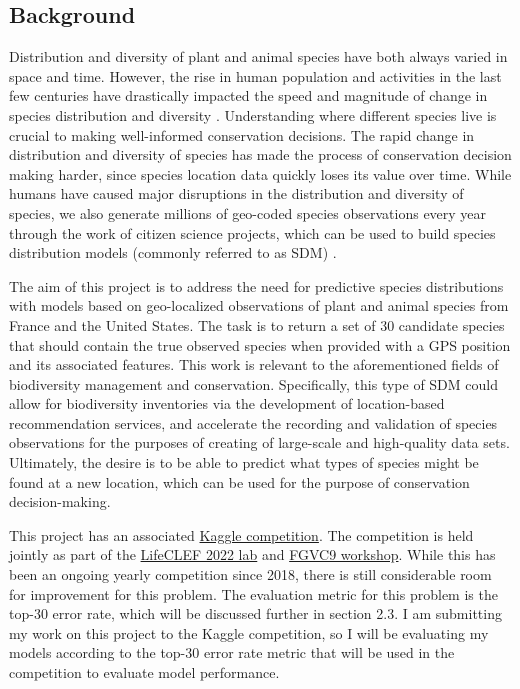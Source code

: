\documentclass[12pt, oneside]{article}
\begin{document}
\begin{normalsize}

\subsection{Background}

Distribution and diversity of plant and animal species have both always varied in space and time. However, the rise in human population and activities in the last few centuries have drastically impacted the speed and magnitude of change in species distribution and diversity \cite{pinto2021predicting}. Understanding where different species live is crucial to making well-informed conservation decisions. The rapid change in distribution and diversity of species has made the process of conservation decision making harder, since species location data quickly loses its value over time. While humans have caused major disruptions in the distribution and diversity of species, we also generate millions of geo-coded species observations every year through the work of citizen science projects, which can be used to build species distribution models (commonly referred to as SDM) \cite{lorieul2021overview}.

	The aim of this project is to address the need for predictive species distributions with models based on geo-localized observations of plant and animal species from France and the United States. The task is to return a set of 30 candidate species that should contain the true observed species when provided with a GPS position and its associated features. This work is relevant to the aforementioned fields of biodiversity management and conservation. Specifically, this type of SDM could allow for biodiversity inventories via the development of location-based recommendation services, and accelerate the recording and validation of species observations for the purposes of creating of large-scale and high-quality data sets. Ultimately, the desire is to be able to predict what types of species might be found at a new location, which can be used for the purpose of conservation decision-making.

This project has an associated \href{https://www.kaggle.com/c/geolifeclef-2022-lifeclef-2022-fgvc9/overview}{Kaggle competition}. The competition is held jointly as part of the \href{https://www.imageclef.org/LifeCLEF2022}{LifeCLEF 2022 lab} and \href{https://sites.google.com/view/fgvc9}{FGVC9 workshop}. While this has been an ongoing yearly competition since 2018, there is still considerable room for improvement for this problem. The evaluation metric for this problem is the top-30 error rate, which will be discussed further in section 2.3. I am submitting my work on this project to the Kaggle competition, so I will be evaluating my models according to the top-30 error rate metric that will be used in the competition to evaluate model performance.


\end{normalsize}
\end{document}
